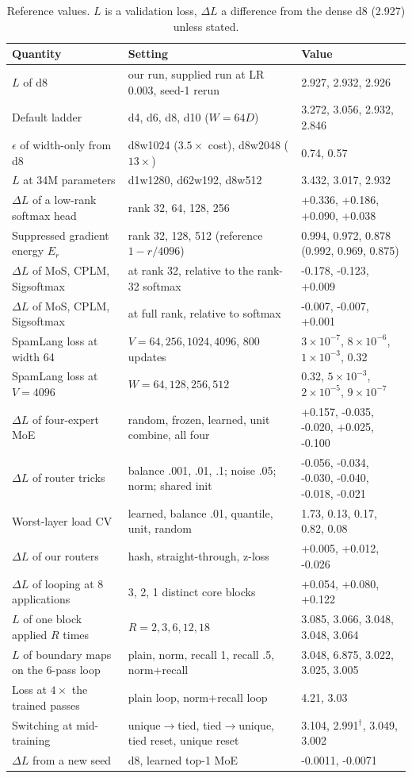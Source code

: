 \begin{table}[H]\centering\small\caption{Reference values. $L$ is a validation loss, $\Delta L$ a difference from the dense d8 (2.927) unless stated.}\label{tab:ref}
\begin{tabular}{p{2.1in}p{2.45in}p{1.85in}}\toprule Quantity & Setting & Value \\ \midrule
$L$ of d8 & our run, supplied run at LR 0.003, seed-1 rerun & 2.927, 2.932, 2.926 \\
Default ladder & d4, d6, d8, d10 ($W=64D$) & 3.272, 3.056, 2.932, 2.846 \\
$\epsilon$ of width-only from d8 & d8w1024 ($3.5\times$ cost), d8w2048 ($13\times$) & 0.74, 0.57 \\
$L$ at 34M parameters & d1w1280, d62w192, d8w512 & 3.432, 3.017, 2.932 \\
$\Delta L$ of a low-rank softmax head & rank 32, 64, 128, 256 & +0.336, +0.186, +0.090, +0.038 \\
Suppressed gradient energy $E_r$ & rank 32, 128, 512 (reference $1-r/4096$) & 0.994, 0.972, 0.878 (0.992, 0.969, 0.875) \\
$\Delta L$ of MoS, CPLM, Sigsoftmax & at rank 32, relative to the rank-32 softmax & -0.178, -0.123, +0.009 \\
$\Delta L$ of MoS, CPLM, Sigsoftmax & at full rank, relative to softmax & -0.007, -0.007, +0.001 \\
SpamLang loss at width 64 & $V=64, 256, 1024, 4096$, 800 updates & $3\times10^{-7}$, $8\times10^{-6}$, $1\times10^{-3}$, 0.32 \\
SpamLang loss at $V=4096$ & $W=64, 128, 256, 512$ & 0.32, $5\times10^{-3}$, $2\times10^{-5}$, $9\times10^{-7}$ \\
$\Delta L$ of four-expert MoE & random, frozen, learned, unit combine, all four & +0.157, -0.035, -0.020, +0.025, -0.100 \\
$\Delta L$ of router tricks & balance .001, .01, .1; noise .05; norm; shared init & -0.056, -0.034, -0.030, -0.040, -0.018, -0.021 \\
Worst-layer load CV & learned, balance .01, quantile, unit, random & 1.73, 0.13, 0.17, 0.82, 0.08 \\
$\Delta L$ of our routers & hash, straight-through, z-loss & +0.005, +0.012, -0.026 \\
$\Delta L$ of looping at 8 applications & 3, 2, 1 distinct core blocks & +0.054, +0.080, +0.122 \\
$L$ of one block applied $R$ times & $R=2, 3, 6, 12, 18$ & 3.085, 3.066, 3.048, 3.048, 3.064 \\
$L$ of boundary maps on the 6-pass loop & plain, norm, recall 1, recall .5, norm+recall & 3.048, 6.875, 3.022, 3.025, 3.005 \\
Loss at $4\times$ the trained passes & plain loop, norm+recall loop & 4.21, 3.03 \\
Switching at mid-training & unique$\to$tied, tied$\to$unique, tied reset, unique reset & 3.104, 2.991$^\dagger$, 3.049, 3.002 \\
$\Delta L$ from a new seed & d8, learned top-1 MoE & -0.0011, -0.0071 \\
\bottomrule\end{tabular}\end{table}
